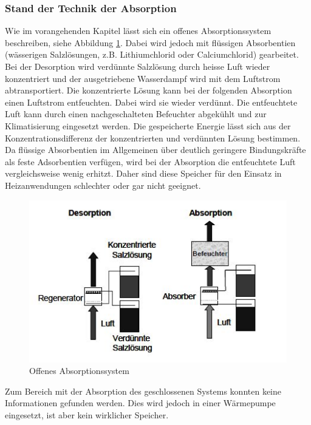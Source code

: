 \documentclass[11pt,a4paper]{scrartcl}
\begin{document}
\subsubsection{Stand der Technik der Absorption}

Wie im vorangehenden Kapitel lässt sich ein offenes Absorptionssystem
beschreiben, siehe Abbildung \ref{fig:offenessystemabsorption}. Dabei wird
jedoch mit flüssigen Absorbentien (wässerigen Salzlösungen, z.B. Lithiumchlorid
oder Calciumchlorid) gearbeitet.
Bei der Desorption wird verdünnte Salzlösung durch heisse Luft wieder
konzentriert und der ausgetriebene Wasserdampf wird mit dem Luftstrom
abtransportiert. Die konzentrierte Lösung kann bei der folgenden Absorption
einen Luftstrom entfeuchten. Dabei wird sie wieder verdünnt. Die entfeuchtete
Luft kann durch einen nachgeschalteten Befeuchter abgekühlt und zur
Klimatisierung eingesetzt werden. Die gespeicherte Energie lässt sich aus der
Konzentrationsdifferenz der konzentrierten und verdünnten Lösung bestimmen. Da
flüssige Absorbentien im Allgemeinen über deutlich geringere Bindungskräfte als
feste Adsorbentien verfügen, wird bei der Absorption die entfeuchtete Luft
vergleichsweise wenig erhitzt. Daher sind diese Speicher für den Einsatz in
Heizanwendungen schlechter oder gar nicht geeignet.

\begin{figure}[h!]
\begin{center}
\includegraphics[scale=1]{images/offenessystemabsorption.jpg}
\caption{Offenes Absorptionssystem \cite{Ferdinandschmidt}}
\label{fig:offenessystemabsorption}
\end{center}
\end{figure}


Zum Bereich mit der Absorption des geschlossenen Systems konnten keine
Informationen gefunden werden. Dies wird jedoch in einer Wärmepumpe eingesetzt,
ist aber kein wirklicher Speicher.
\end{document}
